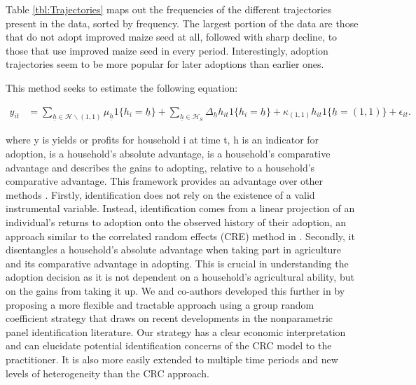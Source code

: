 \documentclass{article}
\begin{document}
Table \ref{tbl:Trajectories} maps out the frequencies of the different trajectories present in the data, sorted by frequency. The largest portion of the data are those that do not adopt improved maize seed at all, followed with sharp decline, to those that use improved maize seed in every period. Interestingly, adoption trajectories seem to be more popular for later adoptions than earlier ones.





This method seeks to estimate the following equation:

\begin{align}
y_{it}&=\sum_{\underline{h}\in\mathcal{H}\backslash (1,1)}\mu_{\underline{h}}1\{h_{i}=\underline{h}\}+\sum_{\underline{h}\in\mathcal{H}_{S}}\Delta_{\underline{h}}h_{it}1\{h_{i}=\underline{h}\}+\kappa_{(1,1)}h_{it}1\{\underline{h}=(1,1)\}+\epsilon_{it}.\label{eq:GRC}
\end{align}

where y is yields or profits for household i at time t, h is an indicator for adoption,  is a household’s absolute advantage,  is a household’s comparative advantage and  describes the gains to adopting, relative to a household’s comparative advantage. This framework provides an advantage over other methods \citep{Wooldridge1997-xj,Heckman1998-pt}. Firstly, identification does not rely on the existence of a valid instrumental variable. Instead, identification comes from a linear projection of an individual's returns to adoption onto the observed history of their adoption, an approach similar to the correlated random effects (CRE) method in \citep{Chamberlain1984-uk}. Secondly, it disentangles a household’s absolute advantage when taking part in agriculture and its comparative advantage in adopting. This is crucial in understanding the adoption decision as it is not dependent on a household’s agricultural ability, but on the gains from taking it up. We and co-authors developed this further in \citep{Tjernstrom_Emilia_Dalia_Ghanem_Oscar_Barriga_Cabanillas_Travis_J_Lybbert_Jeffrey_D_Michler_and_Aleksandr_Michuda2020-bc} by proposing a more flexible and tractable approach using a group random coefficient strategy that draws on recent developments in the nonparametric panel identification literature. Our strategy has a clear economic interpretation and can elucidate potential identification concerns of the CRC model to the practitioner. It is also more easily extended to multiple time periods and new levels of heterogeneity than the CRC approach.
\end{document}
